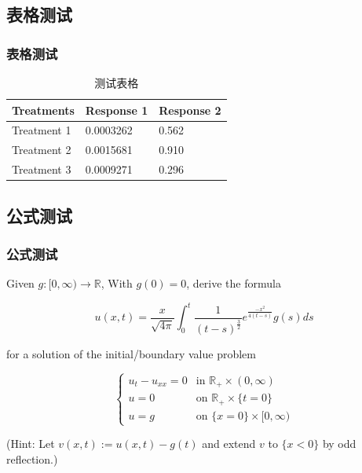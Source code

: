 \documentclass[presentation,aspectratio=1610]{beamer}
\begin{document}

\subsection{表格测试}

\begin{frame}
\frametitle{表格测试}
\begin{table}
\begin{tabular}{l l l}
\toprule
\textbf{Treatments} & \textbf{Response 1} & \textbf{Response 2}\\
\midrule
Treatment 1 & 0.0003262 & 0.562 \\
Treatment 2 & 0.0015681 & 0.910 \\
Treatment 3 & 0.0009271 & 0.296 \\
\bottomrule
\end{tabular}
\caption{测试表格}
\end{table}
\end{frame}


\subsection{公式测试}

\begin{frame}
\frametitle{公式测试}
Given $ g:[0,∞) \to\mathbb{R} $, With $ g(0)=0 $, derive the formula

\begin{equation}
	u(x,t)=\frac{x}{\sqrt{4\pi}}\int_{0}^{t}\frac{1}{(t-s)^{\frac{3}{2}}}e^{\frac{-x^2}{4(t-s)}}g(s)ds
\end{equation}

for a solution of the initial/boundary value problem 

\[
	\begin{cases}
		u_t-u_{xx}  = 0   & \mbox{in }  \mathbb{R}_+ \times(0,\infty)\\
		u           = 0   & \mbox{on }  \mathbb{R}_+ \times\{t=0\}\\
		u           = g   & \mbox{on }  \{x=0\}\times[0,\infty)
	\end{cases}
\]

(Hint: Let $v(x, t) := u(x, t) − g(t)$ and extend $v$ to $\{x < 0\}$ by odd reflection.)
\end{frame}

\end{document}
